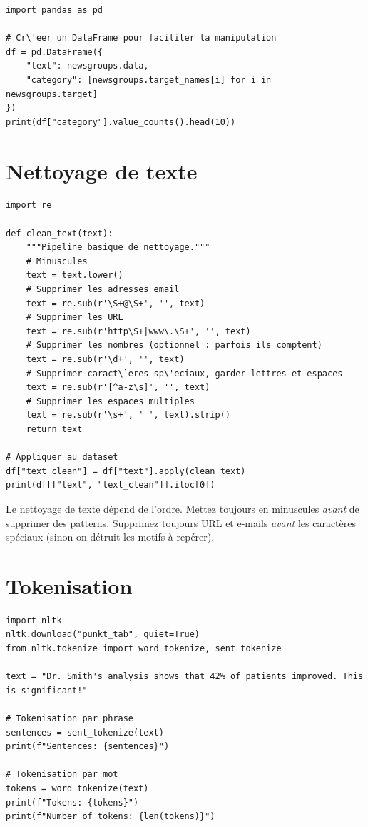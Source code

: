 \begin{verbatim}
import pandas as pd

# Cr\'eer un DataFrame pour faciliter la manipulation
df = pd.DataFrame({
    "text": newsgroups.data,
    "category": [newsgroups.target_names[i] for i in newsgroups.target]
})
print(df["category"].value_counts().head(10))
\end{verbatim}

\section{Nettoyage de texte}

\begin{verbatim}
import re

def clean_text(text):
    """Pipeline basique de nettoyage."""
    # Minuscules
    text = text.lower()
    # Supprimer les adresses email
    text = re.sub(r'\S+@\S+', '', text)
    # Supprimer les URL
    text = re.sub(r'http\S+|www\.\S+', '', text)
    # Supprimer les nombres (optionnel : parfois ils comptent)
    text = re.sub(r'\d+', '', text)
    # Supprimer caract\`eres sp\'eciaux, garder lettres et espaces
    text = re.sub(r'[^a-z\s]', '', text)
    # Supprimer les espaces multiples
    text = re.sub(r'\s+', ' ', text).strip()
    return text

# Appliquer au dataset
df["text_clean"] = df["text"].apply(clean_text)
print(df[["text", "text_clean"]].iloc[0])
\end{verbatim}

\begin{preprocesstip}
Le nettoyage de texte d\'epend de l'ordre. Mettez toujours en minuscules \emph{avant} de supprimer des patterns. Supprimez toujours URL et e-mails \emph{avant} les caract\`eres sp\'eciaux (sinon on d\'etruit les motifs \`a rep\'erer).
\end{preprocesstip}

\section{Tokenisation}

\begin{verbatim}
import nltk
nltk.download("punkt_tab", quiet=True)
from nltk.tokenize import word_tokenize, sent_tokenize

text = "Dr. Smith's analysis shows that 42% of patients improved. This is significant!"

# Tokenisation par phrase
sentences = sent_tokenize(text)
print(f"Sentences: {sentences}")

# Tokenisation par mot
tokens = word_tokenize(text)
print(f"Tokens: {tokens}")
print(f"Number of tokens: {len(tokens)}")
\end{verbatim}

